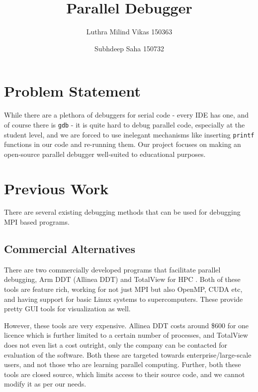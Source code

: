\documentclass[10pt,conference]{IEEEtran}
\begin{document}
\title{Parallel Debugger}

\author{
  Luthra Milind Vikas 150363 \and
  Subhdeep Saha 150732
}

\maketitle

\section{Problem Statement}

While there are a plethora of debuggers for serial code - every IDE has one, and of course there is \texttt{gdb} - it is quite hard to debug parallel code, especially at the student level, and we are forced to use inelegant mechanisms like inserting \texttt{printf} functions in our code and re-running them. Our project focuses on making an open-source parallel debugger well-suited to educational purposes.

\section{Previous Work}

There are several existing debugging methods that can be used for debugging MPI based programs.

\subsection{Commercial Alternatives}

There are two commercially developed programs that facilitate parallel debugging, Arm DDT (Allinea DDT) \cite{ddt} and TotalView for HPC \cite{totalview}. Both of these tools are feature rich, working for not just MPI but also OpenMP, CUDA etc, and having support for basic Linux systems to supercomputers. These provide pretty GUI tools for visualization as well.

However, these tools are very expensive. Allinea DDT costs around \$600 for one licence which is further limited to a certain number of processes, and TotalView does not even list a cost outright, only the company can be contacted for evaluation of the software. Both these are targeted towards enterprise/large-scale users, and not those who are learning parallel computing. Further, both these tools are closed source, which limits access to their source code, and we cannot modify it as per our needs.
\end{document}
